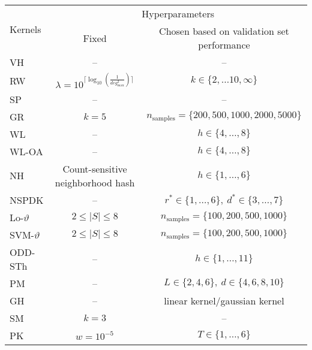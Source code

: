 \documentclass[twoside,11pt]{article}
\begin{document}
\begin{table}[t]
\centering
\scriptsize
\def\arraystretch{1.2}
\begin{tabular}{|l|c|c|} \hline
\multirow{2}{*}{Kernels} & \multicolumn{2}{c|}{Hyperparameters} \\ \cline{2-3} 
                         & Fixed          & Chosen based on validation set performance          \\ \hline
VH                       &   --                & --                 \\ \hline
RW                      &$\lambda = 10^{\lceil \log_{10}(\frac{1}{deg^{2}_{\max}}) \rceil} $                 &   $k \in \{2, \dots 10, \infty \}$              \\ \hline
SP                       &--                   &--                  \\ \hline
GR                       &$k=5$                   &$n_{\text{samples}}=\{200, 500, 1000, 2000, 5000\}$                  \\ \hline
WL                       &  --                 & $h \in \{4, \dots, 8\} $                 \\ \hline
WL-OA                    &  --                 & $h \in \{4, \dots, 8\} $                 \\ \hline
NH                       &Count-sensitive neighborhood hash             & $h\in\{1, \dots, 6\}$                 \\ \hline
NSPDK                    &--                   &  $r^* \in\{1, \dots, 6\}, \ d^* \in\{3, \dots, 7\}$               \\ \hline
Lo-$\vartheta$      &$2\leq|S|\leq 8$                &  $n_{\text{samples}}=\{100, 200, 500, 1000\}$             \\ \hline
SVM-$\vartheta$  &$2\leq|S|\leq 8$  &  $n_{\text{samples}}=\{100, 200, 500, 1000\}$                \\ \hline
ODD-STh                  &--                   & $h \in\{1, \dots, 11\}$                \\ \hline
PM                       &--                   &$L \in \{2, 4, 6\}, \ d \in \{4, 6, 8, 10\}$                  \\ \hline
GH                       &--                   &linear kernel/gaussian kernel                 \\ \hline
SM                       &$k=3$                   &    --              \\ \hline
PK                      &$w=10^{-5}$                   & $T \in \{1, \dots, 6\}$                \\ \hline

\end{tabular}
\end{table}
\end{document}
